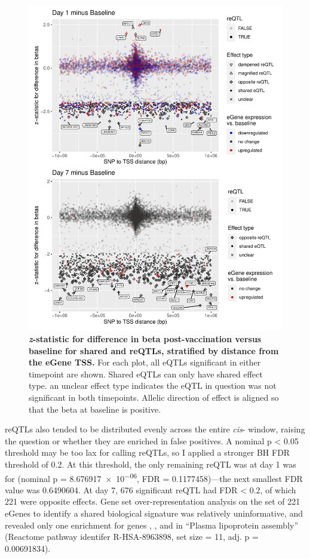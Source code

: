 \begin{figure}
    \centering
    \includegraphics[width=1.0\textwidth]{mainmatter/figures/chapter_03/compare_dge_eqtl.z_sharing.vs.SNP_gene_TSS_dist.pdf}
    \caption{
        \textbf{\textit{z}-statistic for difference in beta post-vaccination versus baseline for shared and \glspl{reQTL}, stratified by distance from the eGene \gls{TSS}.}
        For each plot, all \glspl{eQTL} significant in either timepoint are shown.
        Shared \glspl{eQTL} can only have shared effect type.
        an unclear effect type indicates the \gls{eQTL} in question was not significant in both timepoints.
        Allelic direction of effect is aligned so that the beta at baseline is positive. 
    }
    \label{fig:hird_eQTL_zSharing_vs_TSSdist_mega}
\end{figure}

\glspl{reQTL} also tended to be distributed evenly across the entire \textit{cis}- window,
raising the question or whether they are enriched in false positives.
A nominal p < 0.05 threshold may be too lax for calling \glspl{reQTL},
so I applied a stronger \gls{BH} \gls{FDR} threshold of 0.2.
At this threshold, the only remaining \gls{reQTL} was at day 1 was for  (nominal p = \num{8.676917e-06}, FDR = \num{0.1177458})---the next smallest FDR value was 0.6490604.
At day 7, 676 significant \gls{reQTL} had \gls{FDR} < 0.2, of which 221 were opposite effects.
Gene set over-representation analysis on the set of 221 eGenes to identify a shared biological signature was relatively uninformative, and revealed only one enrichment for genes , ,  and  in \enquote{Plasma lipoprotein assembly} (Reactome pathway identifer R-HSA-8963898, set size = 11, adj. p = \num{0.00691834}).

